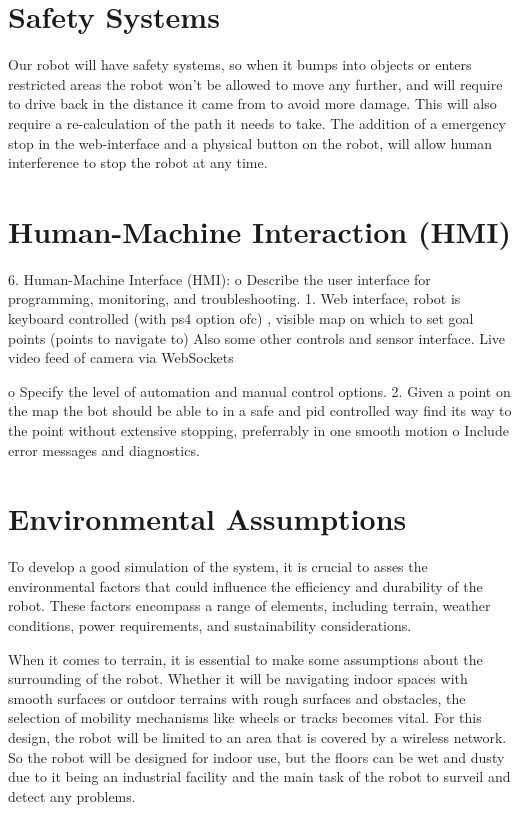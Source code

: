 \documentclass[a4paper]{article}
\begin{document}
\section*{Safety Systems}
Our robot will have safety systems, so when it bumps into objects or enters restricted areas the robot won't be allowed to move any further, and will require to drive back in the distance it came from to avoid more damage. This will also require a re-calculation of the path it needs to take. The addition of a emergency stop in the web-interface and a physical button on the robot, will allow human interference to stop the robot at any time.

\section*{Human-Machine Interaction (HMI)}
6.	Human-Machine Interface (HMI):
o	Describe the user interface for programming, monitoring, and troubleshooting.
1. Web interface, robot is keyboard controlled (with ps4 option ofc) , 		visible map on which to set goal points (points to navigate to)
Also some other controls and sensor interface. Live video feed of 		camera via WebSockets 	

o	Specify the level of automation and manual control options.
2. Given a point on the map the bot should be able to in a safe and pid controlled way find its way to the point without extensive stopping, preferrably in one smooth motion
o	Include error messages and diagnostics.

\section*{Environmental Assumptions}
To develop a good simulation of the system, it is crucial to asses the environmental factors that could influence the efficiency and durability of the robot. These factors encompass a range of elements, including terrain, weather conditions, power requirements, and sustainability considerations.

When it comes to terrain, it is essential to make some assumptions about the surrounding of the robot. Whether it will be navigating indoor spaces with smooth surfaces or outdoor terrains with rough surfaces and obstacles, the selection of mobility mechanisms like wheels or tracks becomes vital. For this design, the robot will be limited to an area that is covered by a wireless network. So the robot will be designed for indoor use, but the floors can be wet and dusty due to it being an industrial facility and the main task of the robot to surveil and detect any problems.
\end{document}
